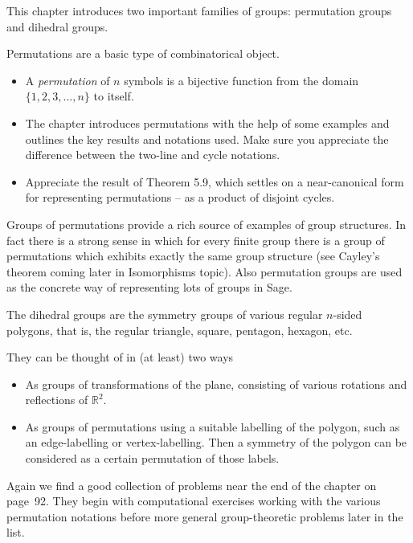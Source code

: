 \documentclass[oneside,10pt]{amsart}
\begin{document}

This chapter introduces two important families of groups: permutation groups and dihedral groups.

Permutations are a basic type of combinatorical object.
\begin{itemize}
\item
A \emph{permutation} of $n$ symbols is a bijective function from the domain $\{ 1, 2, 3, \dots , n\}$ to itself.
\item
The chapter introduces permutations with the help of some examples and outlines the key results and notations used. Make sure you appreciate the difference between the two-line and cycle notations.
\item
Appreciate the result of Theorem 5.9, which settles on a near-canonical form for representing permutations -- as a product of disjoint cycles.
\end{itemize}

Groups of permutations provide a rich source of examples of group structures. In fact there is a strong sense in which for every finite group there is a group of permutations which exhibits exactly the same group structure (see Cayley's theorem coming later in Isomorphisms topic). Also permutation groups are used as the concrete way of representing lots of groups in Sage.

The dihedral groups are the symmetry groups of various regular $n$-sided polygons, that is, the regular triangle, square, pentagon, hexagon, etc.

They can be thought of in (at least) two ways
\begin{itemize}
\item
As groups of transformations of the plane, consisting of various rotations and reflections of $\mathbb{R}^2$.
\item
As groups of permutations using a suitable labelling of the polygon, such as an edge-labelling or vertex-labelling. Then a symmetry of the polygon can be considered as a certain permutation of those labels.
\end{itemize}


Again we find a good collection of problems near the end of the chapter on page~92. They begin with computational exercises working with the various permutation notations before more general group-theoretic problems later in the list.
\end{document}
